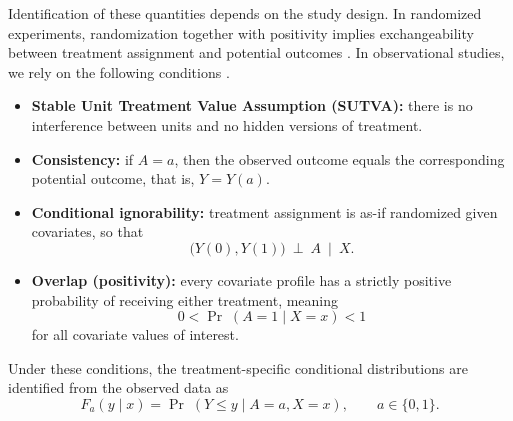 \documentclass[article]{jss}\usepackage[]{graphicx}\usepackage[]{xcolor}
\begin{document}
Identification of these quantities depends on the study design. In
randomized experiments, randomization together with positivity implies
exchangeability between treatment assignment and potential outcomes
\citep{ImbensRubin2015}. In observational studies, we rely on the
following conditions \citep{RosenbaumRubin1983,ImbensRubin2015}.

\begin{itemize}
\item \textbf{Stable Unit Treatment Value Assumption (SUTVA):} there is
no interference between units and no hidden versions of treatment.
\item \textbf{Consistency:} if $A=a$, then the observed outcome equals
the corresponding potential outcome, that is, $Y=Y(a)$.
\item \textbf{Conditional ignorability:} treatment assignment is
as-if randomized given covariates, so that
\begin{equation}
\bigl(Y(0),Y(1)\bigr)\ \perp\ A \ \mid\ X.
\label{eq:ignorability}
\end{equation}
\item \textbf{Overlap (positivity):} every covariate profile has a
strictly positive probability of receiving either treatment, meaning
\begin{equation}
0<\Pr\;(A=1\mid X=x)<1
\label{eq:overlap}
\end{equation}
for all covariate values of interest.
\end{itemize}

Under these conditions, the treatment-specific conditional distributions
are identified from the observed data as
\begin{equation}
F_a(y\mid x)=\Pr\;(Y\le y\mid A=a,X=x),\qquad a\in\{0,1\}.
\label{eq:identification_cdf}
\end{equation}
\end{document}
